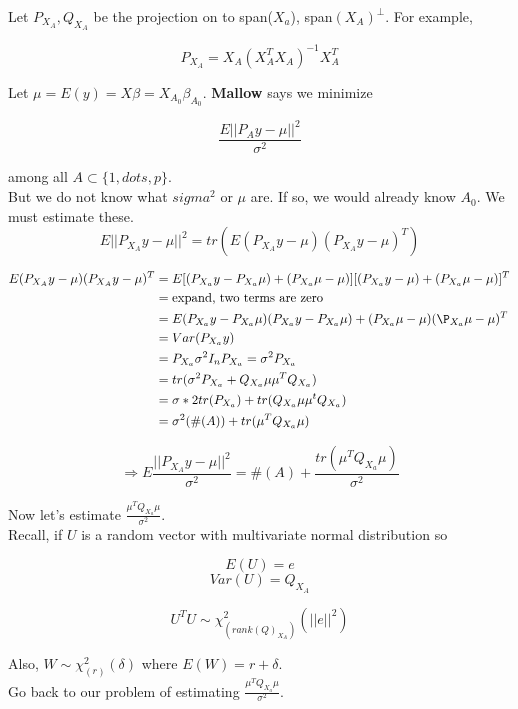 \documentclass[11pt,fleqn]{book} %
\begin{document}
Let $P_{X_A}, Q_{X_A}$ be the projection on to span($X_a$), span$(X_A)^\perp$. For example, 

$$P_{X_A} = X_A(X_A^T X_A)^{-1}X_A^T $$

Let $\mu = E(y) = X\beta = X_{A_0}\beta_{A_0}$. \textbf{Mallow} says we minimize

$$\frac{E||P_{A}y - \mu ||^2}{\sigma^2} $$

among all $A \subset \{1, dots, p \}$.\\

But we do not know what $sigma^2$ or $\mu$ are. If so, we would already know $A_0$. We must estimate these.\\

$$E || P_{X_A} y - \mu ||^2 = tr(E(P_{X_A} y - \mu)(P_{X_A} y - \mu)^T) $$

\begin{align*}
	E(P_{X_A} y - \mu)(P_{X_A} y - \mu)^T &= E[(P_{X_a}y - P_{X_a}\mu) + (P_{X_a}\mu - \mu)][(P_{X_a}y - \mu)+ (P_{X_a}\mu - \mu)]^T\\
		&=  \text{expand, two terms are zero}\\
		&= E(P_{X_a}y - P_{X_a}\mu)(P_{X_a}y - P_{X_a}\mu) + (P_{X_a}\mu  - \mu)(\P_{X_a}\mu - \mu)^T\\
		&= Var(P_{X_a}y)\\
		&= P_{X_a} \sigma^2 I_n P_{X_a} = \sigma^2 P_{X_a}\\
		&= tr(\sigma^2 P_{X_a} + Q_{X_a}\mu\mu^TQ_{X_a})\\
		&= \sigma*2 tr(P_{X_a}) + tr(Q_{X_a}\mu\mu^tQ_{X_a})\\
		&= \sigma^2(\#(A)) + tr(\mu^T Q_{X_a} \mu)\\
\end{align*}

$$\Rightarrow E\frac{ || P_{X_A} y - \mu ||^2}{\sigma^2} = \#(A) + \frac{tr(\mu^T Q_{X_a} \mu)}{\sigma^2}$$

Now let's estimate $\frac{\mu^T Q_{X_a} \mu}{\sigma^2}$. \\

Recall, if $U$ is a random vector with multivariate normal distribution so

$$E(U) = e $$
$$Var(U) = Q_{X_A} $$

$$U^TU \sim \chi^2_{(rank(Q)_{X_A})} (||e||^2) $$

Also, $W \sim \chi^2_{(r)} (\delta)$ where $E(W) = r + \delta$.\\

Go back to our problem of estimating $\frac{\mu^T Q_{X_a} \mu}{\sigma^2}$. \\
\end{document}
